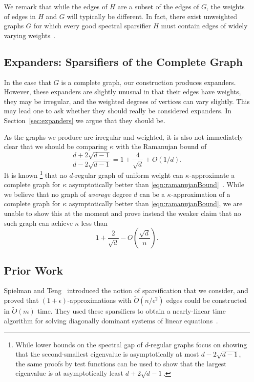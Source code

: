 \documentclass[12pt]{article}
\def\softO#1{\widetilde{{O}} \left( #1 \right)}
\def\bigO#1{{{O}}\left( #1 \right) }
\begin{document}
We remark that while the edges of $H$ are a subset of the edges of $G$,
  the weights of edges in $H$ and $G$ will typically be different.
In fact, there exist unweighted graphs $G$ for which every good spectral 
  sparsifier $H$ must contain edges of 
  widely varying weights~\cite{SpielmanTengSparsifier}.

\subsection{Expanders: Sparsifiers of the Complete Graph}
In the case that $G$ is a complete graph, 
  our construction produces expanders.
However, these expanders are slightly unusual in that their edges have weights,
  they may be irregular, and the weighted degrees of vertices can vary slightly.
This may lead one to ask whether they should really be considered expanders.
In Section~\ref{sec:expanders} we argue that they should be.

As the graphs we produce are irregular and weighted, it is also not immediately
  clear that we should be comparing $\kappa$ with the Ramanujan bound of
\begin{equation}\label{eqn:ramanujanBound}
\frac{
        d + 2 \sqrt{d-1}
}{
        d - 2 \sqrt{d-1}
}
=
1+\frac{4}{\sqrt{d}}+O(1/d).
\end{equation}
It is known%
\footnote{While lower bounds on the spectral gap of $d$-regular graphs
  focus on showing that the second-smallest eigenvalue is asymptotically
  at most
  $d - 2 \sqrt{d-1}$, the same proofs by test functions
  can be used to show that the
  largest eigenvalue is at asymptotically least $d + 2 \sqrt{d-1}$.}
 that no $d$-regular graph of uniform weight
  can $\kappa$-approximate a complete graph for $\kappa$ 
  asymptotically better than 
  \eqref{eqn:ramanujanBound}~\cite{Nilli}.
While we believe that no graph of {\em average} degree $d$ can be a
  $\kappa$-approximation of a complete graph for $\kappa$ asymptotically
  better than \eqref{eqn:ramanujanBound}, we are unable to show this at the
  moment and prove
  instead the weaker claim that no such graph can achieve $\kappa$ 
  less than
\[
1 + 
\frac{2}{\sqrt{d}}
- \bigO{\frac{\sqrt{d}}{n}}.
\]


\subsection{Prior Work}\label{sec:prior}
Spielman and Teng~\cite{SpielmanTengPrecon,SpielmanTengSparsifier} 
  introduced the notion of
  sparsification that we consider, and proved that $(1+\epsilon )$-approxim\-ations
  with $\softO{n / \epsilon^{2}}$ edges could be constructed in $\softO{m}$ time.
They used these sparsifiers to obtain a nearly-linear time algorithm
  for solving diagonally dominant systems of linear 
  equations~\cite{SpielmanTengPrecon,SpielmanTengLinsolve}.
\end{document}
